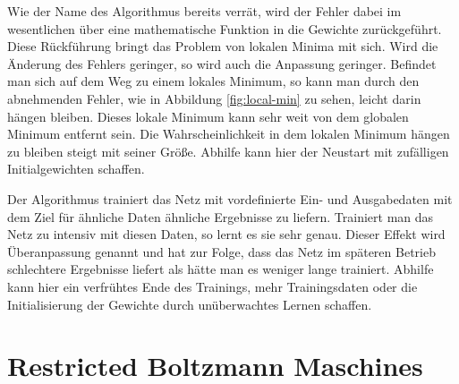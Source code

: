 Wie der Name des Algorithmus bereits verrät, wird der Fehler dabei im wesentlichen über eine mathematische Funktion in die Gewichte zurückgeführt. Diese Rückführung bringt das Problem von lokalen Minima mit sich. Wird die Änderung des Fehlers geringer, so wird auch die Anpassung geringer. Befindet man sich auf dem Weg zu einem lokales Minimum, so kann man durch den abnehmenden Fehler, wie in Abbildung \ref{fig:local-min} zu sehen, leicht darin hängen bleiben. Dieses lokale Minimum kann sehr weit von dem globalen Minimum entfernt sein. Die Wahrscheinlichkeit in dem lokalen Minimum hängen zu bleiben steigt mit seiner Größe. Abhilfe kann hier der Neustart mit zufälligen Initialgewichten schaffen.

Der Algorithmus trainiert das Netz mit vordefinierte Ein- und Ausgabedaten mit dem Ziel für ähnliche Daten ähnliche Ergebnisse zu liefern. Trainiert man das Netz zu intensiv mit diesen Daten, so lernt es sie sehr genau. Dieser Effekt wird Überanpassung genannt und hat zur Folge, dass das Netz im späteren Betrieb schlechtere Ergebnisse liefert als hätte man es weniger lange trainiert. Abhilfe kann hier ein verfrühtes Ende des Trainings, mehr Trainingsdaten oder die Initialisierung der Gewichte durch unüberwachtes Lernen schaffen.

\section{Restricted Boltzmann Maschines}


